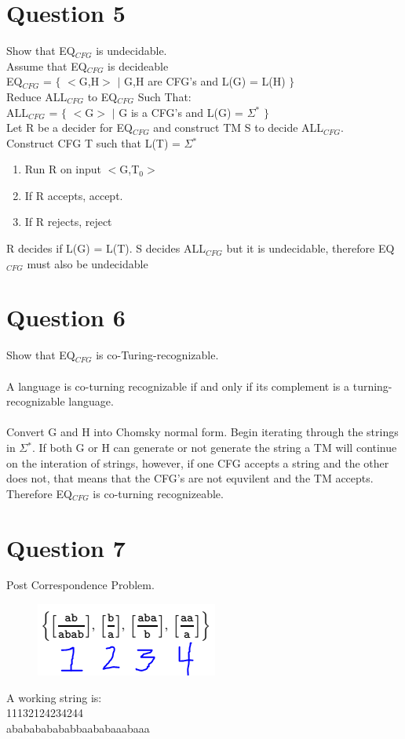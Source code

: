 \documentclass[10pt,a4paper]{article}
\begin{document}
\section*{Question 5}
Show that EQ$_{CFG}$ is undecidable.\\
Assume that EQ$_{CFG}$ is decideable\\
EQ$_{CFG}$ = $\lbrace$ $<$G,H$>$ $\mid$ G,H are CFG's and L(G) = L(H) $\rbrace$
\\
Reduce ALL$_{CFG}$ to EQ$_{CFG}$ Such That:
\\
ALL$_{CFG}$ = $\lbrace$ $<$G$>$ $\mid$ G is a CFG's and L(G) = $\Sigma$$^{\ast}$ $\rbrace$
\\
Let R be a decider for EQ$_{CFG}$ and construct TM S to decide ALL$_{CFG}$.
\\
Construct CFG T such that L(T) = $\Sigma$$^{\ast}$
\begin{enumerate}
  \item Run R on input $<$G,T$_{0}$$>$
  \item If R accepts, accept.
  \item If R rejects, reject 
\end{enumerate}
R decides if L(G) = L(T). S decides ALL$_{CFG}$ but it is undecidable, therefore EQ$_{CFG}$ must also be undecidable 

\section*{Question 6}
Show that EQ$_{CFG}$ is co-Turing-recognizable.\\\\
A language is co-turning recognizable if and only if its complement is a turning-recognizable language.\\
\\
Convert G and H into Chomsky normal form. Begin iterating through the strings in $\Sigma$$^{\ast}$. If both G or H can generate or not generate the string a TM will continue on the interation of strings, however, if one CFG accepts a string and the other does not, that means that the CFG's are not equvilent and the TM accepts. Therefore EQ$_{CFG}$  is co-turning recognizeable.
\section*{Question 7}
Post Correspondence Problem.\\
	\begin{figure}[h]
		\includegraphics[scale = .5]{338q7.png}
  		\label{fig:PCP}
	\end{figure}
A working string is:\\
11132124234244\\
ababababababbaababaaabaaa
\end{document}
